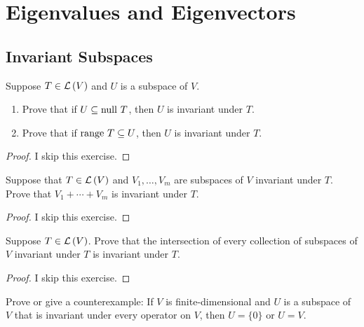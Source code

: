 \chapter{Eigenvalues and Eigenvectors}

\section{Invariant Subspaces}

\begin{exercise}
    Suppose $T\in\mathcal{L}\left({V}\right)$ and $U$ is a subspace of $V$.
    \begin{enumerate}[label={(\alph*)}]
        \item Prove that if $U\subseteq \operatorname{null}\,{T}$, then $U$ is invariant under $T$.
        \item Prove that if $\operatorname{range}\,{T}\subseteq U$, then $U$ is invariant under $T$.
    \end{enumerate}
\end{exercise}

\begin{proof}
    I skip this exercise.
\end{proof}
\newpage

\begin{exercise}
    Suppose that $T\in\mathcal{L}\left({V}\right)$ and $V_{1}, \ldots, V_{m}$ are subspaces of $V$ invariant under $T$. Prove that $V_{1} + \cdots + V_{m}$ is invariant under $T$.
\end{exercise}

\begin{proof}
    I skip this exercise.
\end{proof}
\newpage

\begin{exercise}
    Suppose $T\in\mathcal{L}\left({V}\right)$. Prove that the intersection of every collection of subspaces of $V$ invariant under $T$ is invariant under $T$.
\end{exercise}

\begin{proof}
    I skip this exercise.
\end{proof}
\newpage

\begin{exercise}
    Prove or give a counterexample: If $V$ is finite-dimensional and $U$ is a subspace of $V$ that is invariant under every operator on $V$, then $U = \{0\}$ or $U = V$.
\end{exercise}

